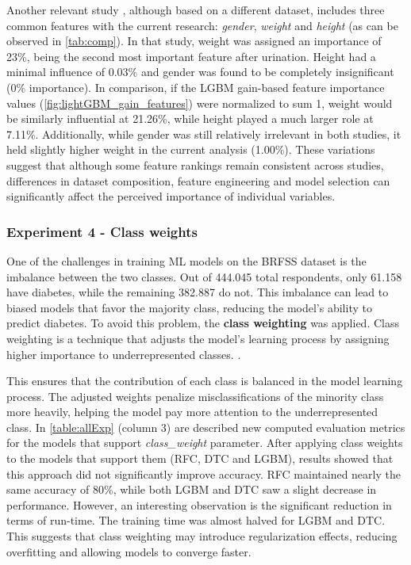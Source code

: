 \documentclass[runningheads]{llncs}
\begin{document}
Another relevant study \cite{GANIE2022100092}, although based on a different dataset, includes three common features with the current research: \textit{gender}, \textit{weight} and \textit{height} (as can be observed in \autoref{tab:comp}). 
In that study, weight was assigned an importance of 23\%, being the second most important feature after urination. Height had a minimal influence of 0.03\% and gender was found to be completely insignificant (0\% importance). 
In comparison, if the LGBM gain-based feature importance values (\autoref{fig:lightGBM_gain_features}) were normalized to sum 1,  weight would be similarly influential at 21.26\%, while height played a much larger role at 7.11\%. Additionally, while gender was still relatively irrelevant in both studies, it held slightly higher weight in the current analysis (1.00\%). These variations suggest that although some feature rankings remain consistent across studies, differences in dataset composition, feature engineering and model selection can significantly affect the perceived importance of individual variables.

\subsubsection{Experiment 4 - Class weights} 

One of the challenges in training ML models on the BRFSS dataset is the imbalance between the two classes. Out of 444.045 total respondents, only 61.158 have diabetes, while the remaining 382.887 do not. This imbalance can lead to biased models that favor the majority class, reducing the model's ability to predict diabetes. To avoid this problem, the \textbf{class weighting} was applied. Class weighting is a technique that adjusts the model's learning process by assigning higher importance to underrepresented classes.
\cite{classWeights2023}. 

This ensures that the contribution of each class is balanced in the model learning process. The adjusted weights penalize misclassifications of the minority class more heavily, helping the model pay more attention to the underrepresented class. 
In \autoref{table:allExp} (column 3) are described new computed evaluation metrics for the models that support \textit{class\_weight} parameter. 
After applying class weights to the models that support them (RFC, DTC and LGBM), results showed that this approach did not significantly improve accuracy. RFC maintained nearly the same accuracy of 80\%, while both LGBM and DTC saw a slight decrease in performance. However, an interesting observation is the significant reduction in terms of run-time. The training time was almost halved for LGBM and DTC. This suggests that class weighting may introduce regularization effects, reducing overfitting and allowing models to converge faster.
\end{document}
